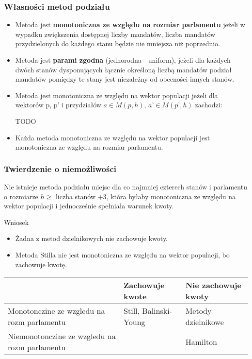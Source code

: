 \documentclass[12pt,a4paper]{article}
\begin{document}
\subsubsection{Własności metod podziału}
\begin{itemize}
\item Metoda jest \textbf{monotoniczna ze względu na rozmiar parlamentu} jeżeli w wypadku zwiększenia dostępnej liczby mandatów, liczba mandatów przydzielonych do każdego stanu będzie nie mniejsza niż poprzednio.
\item Metoda jest \textbf{parami zgodna} (jednorodna - uniform), jeżeli dla każdych dwóch stanów dysponujących łącznie określoną liczbą mandatów podział mandatów pomiędzy te stany jest niezależny od obecności innych stanów.

\item Metoda jest monotoniczna ze względu na wektor populacji jeżeli dla wektorów p, p’ i przydziałów $a\in M(p,h)$, $a’\in M(p’,h)$ zachodzi:

TODO 

\item Każda metoda monotoniczna ze względu na wektor populacji jest monotoniczna ze względu na rozmiar parlamentu.

\end{itemize}

\subsubsection{Twierdzenie o niemożliwości}

Nie istnieje metoda podziału miejsc dla co najmniej czterech stanów i parlamentu o rozmiarze
$h \geq $ liczba stanów +3, która byłaby monotoniczna ze względu na wektor populacji i jednocześnie spełniała warunek kwoty.

Wniosek

\begin{itemize}
\item Żadna z metod dzielnikowych nie zachowuje kwoty.
\item Metoda Stilla nie jest monotoniczna ze względu na wektor populacji, bo zachowuje kwotę.
\end{itemize}

\begin{center}
    \begin{tabular}{ | p{5cm} |l | l |}
    \hline
      & Zachowuje kwote &Nie zachowuje kwoty \\ \hline
    Monotonczine ze wzgledu na rozm parlamentu & Still, Balinski-Young& Metody dzielnikowe \\ \hline
    Niemonotonczine ze wzgledu na rozm parlamentu& & Hamilton \\ \hline
    
    
    \end{tabular}
\end{center}
\end{document}
